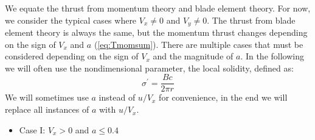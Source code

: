 \documentclass{article}
\begin{document}
We equate the thrust from momentum theory and blade element theory.  For now, we consider the typical cases where $V_x \ne 0$ and $V_y \ne 0$.  The thrust from blade element theory is always the same, but the momentum thrust changes depending on the sign of $V_x$ and $a$ (\cref{eq:Tmomsum}).  There are multiple cases that must be considered depending on the sign of $V_x$ and the magnitude of $a$.  In the following we will often use the nondimensional parameter, the local solidity, defined as:
\begin{equation}
    \sigma^\prime = \frac{B c}{2 \pi r}
\end{equation}
We will sometimes use $a$ instead of $u/V_x$ for convenience, in the end we will replace all instances of $a$ with $u/V_x$.

\begin{itemize}

\item Case I: $V_x > 0$ and $a \le 0.4$


\end{itemize}
\end{document}
